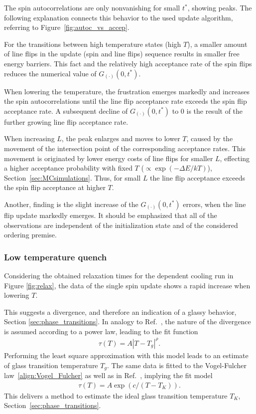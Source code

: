 The spin autocorrelations are only nonvanishing for small $t^*$, showing peaks. The following explanation connects this 
behavior to the used update algorithm, referring to Figure~\ref{fig:autoc_vs_accep}.

For the transitions between high temperature states (high $T$), a smaller amount of line flips in the update (spin and line flips) sequence results in smaller free energy 
barriers. This fact and the relatively high acceptance rate of the spin flips  reduces the numerical value of $G_{(\cdot)}(0,t^*)$. 

When lowering the temperature, the frustration emerges markedly and increases the spin autocorrelations until the line flip acceptance rate exceeds the 
spin flip acceptance rate. A subsequent decline of $G_{(\cdot)}(0,t^*)$ to $0$ is the result of the further growing line flip acceptance rate. 

When 
increasing $L$, the peak enlarges and moves to lower $T$, caused by the movement 
of the intersection point of the corresponding acceptance rates. This movement is originated by lower energy costs of line flips for smaller $L$, 
effecting a higher acceptance probability with fixed $T$ ($\propto\exp(-\Delta E/kT)$), Section~\ref{sec:MCsimulations}. Thus, for small $L$ the 
line flip acceptance exceeds the spin flip acceptance at higher $T$. 

Another, finding is the slight increase of the $G_{(\cdot)}(0,t^*)$ errors, 
when the line flip update markedly emerges. It should be emphasized that all of the observations are independent of the initialization state and of 
the considered ordering premise.


\subsubsection*{Low temperature quench}

Considering the obtained relaxation times for the dependent cooling run in Figure \ref{fig:relax}, the data of the single spin update shows a 
rapid increase when lowering $T$. 

This suggests a divergence, and therefore an indication of a glassy behavior, Section \ref{sec:phase_transitions}.
In analogy to Ref.~\cite{Timmons2018}, the nature of the divergence is assumed according to a power law, leading to the fit function 
\begin{align*}
  \tau(T)=A|T-T_g|^\rho.
\end{align*}
Performing the least square approximation with this model leads to an estimate of glass transition temperature $T_g$. The same data is fitted to 
the Vogel-Fulcher law~\eqref{align:Vogel_Fulcher} as well as in Ref.~\cite{Timmons2018}, implying the fit model
\begin{align*}
  \tau(T)=A\exp(c/(T-T_K)).
\end{align*}
This delivers a method to estimate the ideal glass transition temperature $T_K$, Section~\ref{sec:phase_transitions}. 


